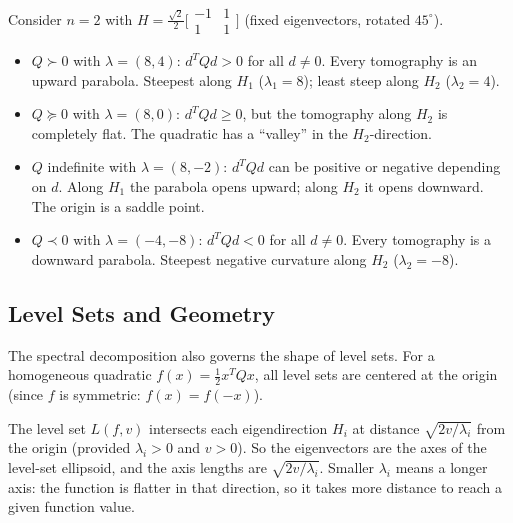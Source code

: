 \begin{example}\label{exm:quad-tomographies}
	Consider $n = 2$ with $H = \frac{\sqrt{2}}{2}\bigl[\begin{smallmatrix} -1 & 1 \\ 1 & 1 \end{smallmatrix}\bigr]$ (fixed eigenvectors, rotated $45^\circ$).
	\begin{itemize}
		\item $Q \succ 0$ with $\lambda = (8, 4)$: $d^T Q d > 0$ for all $d \neq 0$.
			Every tomography is an upward parabola.
			Steepest along $H_1$ ($\lambda_1 = 8$); least steep along $H_2$ ($\lambda_2 = 4$).
		\item $Q \succeq 0$ with $\lambda = (8, 0)$: $d^T Q d \geq 0$, but the tomography along $H_2$ is completely flat.
			The quadratic has a ``valley'' in the $H_2$-direction.
		\item $Q$ indefinite with $\lambda = (8, -2)$: $d^T Q d$ can be positive or negative depending on $d$.
			Along $H_1$ the parabola opens upward; along $H_2$ it opens downward.
			The origin is a saddle point.
		\item $Q \prec 0$ with $\lambda = (-4, -8)$: $d^T Q d < 0$ for all $d \neq 0$.
			Every tomography is a downward parabola.
			Steepest negative curvature along $H_2$ ($\lambda_2 = -8$).
	\end{itemize}
\end{example}


\subsection{Level Sets and Geometry}\label{sec:level-sets}

The spectral decomposition also governs the shape of level sets.
For a homogeneous quadratic $f(x) = \frac{1}{2} x^T Q x$, all level sets are centered at the origin (since $f$ is symmetric: $f(x) = f(-x)$).

The level set $L(f, v)$ intersects each eigendirection $H_i$ at distance $\sqrt{2v / \lambda_i}$ from the origin (provided $\lambda_i > 0$ and $v > 0$).
So the eigenvectors are the axes of the level-set ellipsoid, and the axis lengths are $\sqrt{2v / \lambda_i}$.
Smaller $\lambda_i$ means a longer axis: the function is flatter in that direction, so it takes more distance to reach a given function value.


